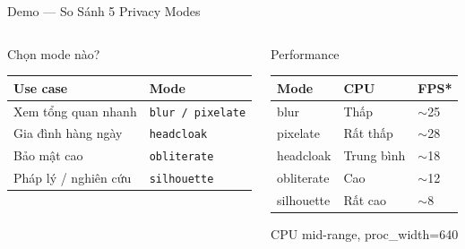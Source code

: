 \documentclass[aspectratio=169, 12pt]{beamer}
\begin{document}
\begin{frame}{Demo --- So Sánh 5 Privacy Modes}

\begin{center}
\end{center}

\vspace{0.5em}
\begin{columns}[T]
\begin{block}{Chọn mode nào?}
\footnotesize
\renewcommand{\arraystretch}{1.3}
\begin{tabular}{ll}
\textbf{Use case} & \textbf{Mode} \\
\hline
Xem tổng quan nhanh & \texttt{blur / pixelate} \\
Gia đình hàng ngày & \texttt{headcloak} \\
Bảo mật cao & \texttt{obliterate} \\
Pháp lý / nghiên cứu & \texttt{silhouette} \\
\end{tabular}
\end{block}

\begin{block}{Performance}
\footnotesize
\begin{tabular}{lll}
\textbf{Mode} & \textbf{CPU} & \textbf{FPS*} \\
\hline
blur & Thấp & $\sim$25 \\
pixelate & Rất thấp & $\sim$28 \\
headcloak & Trung bình & $\sim$18 \\
obliterate & Cao & $\sim$12 \\
silhouette & Rất cao & $\sim$8 \\
\end{tabular}
\footnotesize *CPU mid-range, proc\_width=640
\end{block}
\end{columns}
\end{frame}
\end{document}
